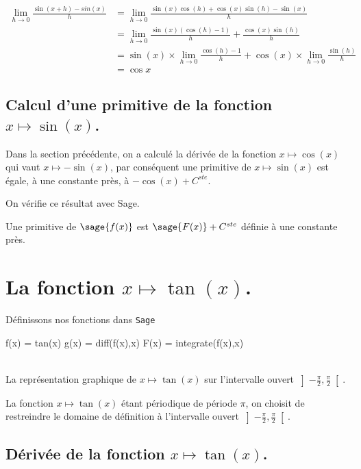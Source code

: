 \documentclass[a4paper,landscape,17pt]{extreport} %
\begin{document}
\begin{align*}
\lim_{h\to 0} \frac{\sin(x+h)-sin(x)}{h} & = \lim_{h\to 0} \frac{\sin(x)\cos(h)+\cos(x)\sin(h)-\sin(x)}{h} \\  & =  \lim_{h\to 0} \frac{\sin(x)(\cos(h)-1)}{h}+\frac{\cos(x)\sin(h)}{h} \\ & = \sin(x) \times  \lim_{h\to 0} \frac{\cos(h)-1}{h}+\cos(x) \times  \lim_{h\to 0}  \frac{\sin(h)}{h} \\ & = \cos{x}
\end{align*}

\subsection{Calcul d'une primitive de la fonction  $x \mapsto \sin(x)$.}

Dans la section précédente, on a calculé la dérivée de la fonction $x \mapsto \cos(x)$ qui vaut $x \mapsto -\sin(x)$, par conséquent une primitive de $x \mapsto \sin(x)$ est égale, à une constante près, à $ - \cos(x) + C^{ste} $.

On vérifie ce résultat avec Sage.

Une primitive de $\sage{f(x)}$ est $ \sage{F(x)} + C^{ste} $ définie à une constante près.


\section{La fonction  $x \mapsto \tan(x)$.}

Définissons nos fonctions dans {\texttt{Sage}}
\begin{sageblock}
    f(x) = tan(x)
    g(x) = diff(f(x),x)
    F(x) = integrate(f(x),x)
\end{sageblock}



\begin{center}
 \\
La représentation graphique de $x\mapsto \tan(x)$ sur l'intervalle ouvert $ \left] -\frac{\pi}{ 2} , \frac{\pi}{ 2} \right[ $.
\end{center}


La fonction $x \mapsto \tan(x)$ étant périodique de période $\pi$, on choisit de restreindre le domaine de définition à l'intervalle ouvert $ \left] -\frac{\pi}{ 2} , \frac{\pi}{ 2} \right[ $.


\subsection{Dérivée de la fonction $x \mapsto \tan(x)$.}
\end{document}
